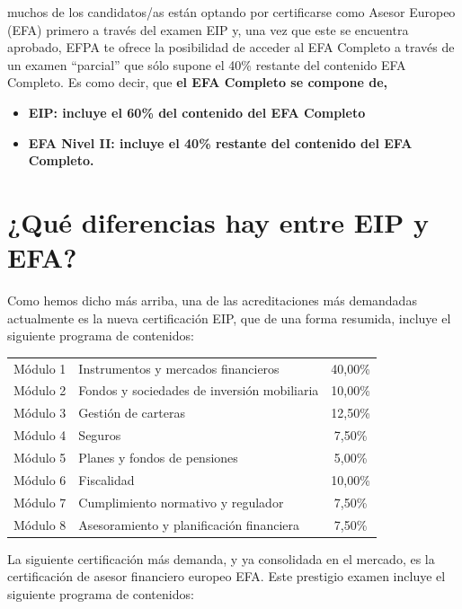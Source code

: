 \documentclass[
  letterpaper,
  DIV=11,
  numbers=noendperiod]{scrreprt}
\begin{document}
muchos de los candidatos/as están optando por certificarse como Asesor
Europeo (EFA) primero a través del examen EIP y, una vez que este se
encuentra aprobado, EFPA te ofrece la posibilidad de acceder al EFA
Completo a través de un examen ``parcial'' que sólo supone el 40\%
restante del contenido EFA Completo. Es como decir, que \textbf{el EFA
Completo se compone de,}

\begin{itemize}
\item
  \textbf{EIP: incluye el 60\% del contenido del EFA Completo}
\item
  \textbf{EFA Nivel II: incluye el 40\% restante del contenido del EFA
  Completo.}
\end{itemize}

\hypertarget{quuxe9-diferencias-hay-entre-eip-y-efa}{%
\section*{\texorpdfstring{\textbf{¿Qué diferencias hay entre EIP y
EFA?}}{¿Qué diferencias hay entre EIP y EFA?}}\label{quuxe9-diferencias-hay-entre-eip-y-efa}}


Como hemos dicho más arriba, una de las acreditaciones más demandadas
actualmente es la nueva certificación EIP, que de una forma resumida,
incluye el siguiente programa de contenidos:

\begin{longtable}[]{@{}clc@{}}
\toprule()
\endhead
Módulo 1 & Instrumentos y mercados financieros & 40,00\% \\
Módulo 2 & Fondos y sociedades de inversión mobiliaria & 10,00\% \\
Módulo 3 & Gestión de carteras & 12,50\% \\
Módulo 4 & Seguros & 7,50\% \\
Módulo 5 & Planes y fondos de pensiones & 5,00\% \\
Módulo 6 & Fiscalidad & 10,00\% \\
Módulo 7 & Cumplimiento normativo y regulador & 7,50\% \\
Módulo 8 & Asesoramiento y planificación financiera & 7,50\% \\
\bottomrule()
\end{longtable}

La siguiente certificación más demanda, y ya consolidada en el mercado,
es la certificación de asesor financiero europeo EFA. Este prestigio
examen incluye el siguiente programa de contenidos:
\end{document}
